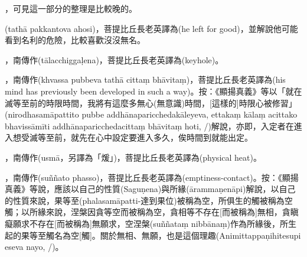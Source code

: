 \startitemgroup[noteitems]
\item{}，可見這一部分的整理是比較晚的。
\stopitemgroup

\startitemgroup[noteitems]
\item{}(tathā pakkantova ahosi)，菩提比丘長老英譯為(he left for good)，並解說他可能看到名利的危險，比較喜歡沒沒無名。
\stopitemgroup

\startitemgroup[noteitems]
\item{}，南傳作(tālacchiggaḷena)，菩提比丘長老英譯為(keyhole)。
\stopitemgroup

\startitemgroup[noteitems]
\item{}，南傳作(khvassa pubbeva tathā cittaṃ bhāvitaṃ)，菩提比丘長老英譯為(his mind has previously been developed in such a way)。按：《顯揚真義》等以「就在滅等至前的時限時間，我將有這麼多無心(無意識)時間，[這樣的]時限心被修習」(nirodhasamāpattito pubbe addhānaparicchedakāleyeva, ettakaṃ kālaṃ acittako bhavissāmīti addhānaparicchedacittaṃ bhāvitaṃ hoti, /)解說，亦即，入定者在進入想受滅等至前，就先在心中設定要進入多久，俟時間到就能出定。
\stopitemgroup

\startitemgroup[noteitems]
\item{}，南傳作(usmā，另譯為「煖」)，菩提比丘長老英譯為(physical heat)。
\stopitemgroup

\startitemgroup[noteitems]
\item{}，南傳作(suññato phasso)，菩提比丘長老英譯為(emptiness-contact)。按：《顯揚真義》等說，應該以自己的性質(Saguṇena)與所緣(ārammaṇenāpi)解說，以自己的性質來說，果等至(phalasamāpatti-達到果位)被稱為空，所俱生的觸被稱為空觸；以所緣來說，涅槃因貪等空而被稱為空，貪相等不存在[而被稱為]無相，貪瞋癡願求不存在[而被稱為]無願求，空涅槃(suññataṃ nibbānaṃ)作為所緣後，所生起的果等至觸名為空[觸]。關於無相、無願，也是這個理趣(Animittappaṇihitesupi eseva nayo, /)。
\stopitemgroup

